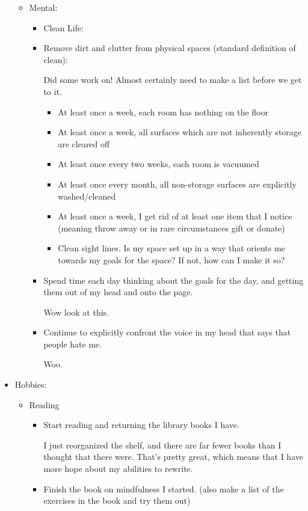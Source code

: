 \documentclass[12pt]{article}[titlepage]
\renewcommand{\,}{\textsuperscript{,}}
\begin{document}
\begin{itemize}
\begin{itemize}
\item Mental:   
\begin{itemize}  
\item Clean Life:   
\item Remove dirt and clutter from physical spaces (standard definition of clean):   
  
Did some work on!  
Almost certainly need to make a list before we get to it.  
\begin{itemize}  
\item At least once a week, each room has nothing on the floor  
\item At least once a week, all surfaces which are not inherently storage are cleared off  
\item At least once every two weeks, each room is vacuumed  
\item At least once every month, all non-storage surfaces are explicitly washed/cleaned  
\item At least once a week, I get rid of at least one item that I notice (meaning throw away or in rare circumstances gift or donate)  
\item Clean sight lines. Is my space set up in a way that orients me towards my goals for the space? If not, how can I make it so?  
\end{itemize}  
\item Spend time each day thinking about the goals for the day, and getting them out of my head and onto the page.

Wow look at this.  
\item Continue to explicitly confront the voice in my head that says that people hate me.  
  
Woo.  
\end{itemize}  
\end{itemize}   
\item Hobbies:   
\begin{itemize}   
\item Reading  
\begin{itemize}  
\item Start reading and returning the library books I have.

I just reorganized the shelf, and there are far fewer books than I thought that there were.  
That's pretty great, which means that I have more hope about my abilities to rewrite.  
\item Finish the book on mindfulness I started. (also make a list of the exercises in the book and try them out)


\end{itemize}
\end{itemize}
\end{itemize}
\end{document}
